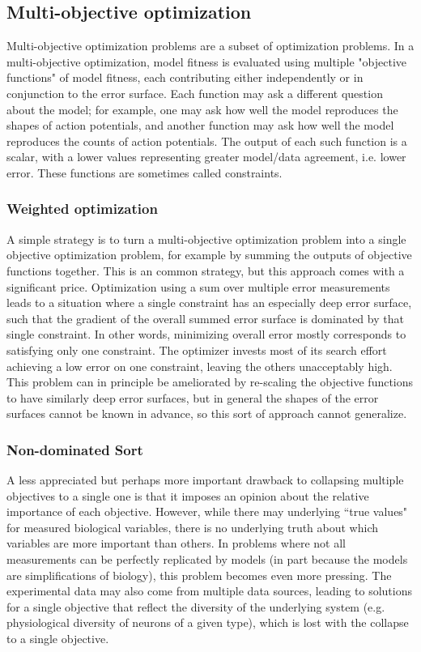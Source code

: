 \subsection{Multi-objective optimization} Multi-objective optimization problems are a subset of optimization problems.
In a multi-objective optimization, model fitness is evaluated using multiple "objective functions" of model fitness, each contributing either independently or in conjunction to the error surface.
Each function may ask a different question about the model; for example, one may ask how well the model reproduces the shapes of action potentials, and another function may ask how well the model reproduces the counts of action potentials.
The output of each such function is a scalar, with a lower values representing greater model/data agreement, i.e. lower error.
These functions are sometimes called constraints. 

\subsubsection{Weighted optimization} A simple strategy is to turn a multi-objective optimization problem into a single objective optimization problem, for example by summing the outputs of objective functions together. 
This is an common strategy, but this approach comes with a significant price.
Optimization using a sum over multiple error measurements leads to a situation where a single constraint has an especially deep error surface, such that the gradient of the overall summed error surface is dominated by that single constraint.
In other words, minimizing overall error mostly corresponds to satisfying only one constraint.
The optimizer invests most of its search effort achieving a low error on one constraint, leaving the others unacceptably high.
This problem can in principle be ameliorated by re-scaling the objective functions to have similarly deep error surfaces, but in general the shapes of the error surfaces cannot be known in advance, so this sort of approach cannot generalize.

\subsubsection{Non-dominated Sort} A less appreciated but perhaps more important drawback to collapsing multiple objectives to a single one is that it imposes an opinion about the relative importance of each objective.
However, while there may underlying ``true values" for measured biological variables, there is no underlying truth about which variables are more important than others.
In problems where not all measurements can be perfectly replicated by models (in part because the models are simplifications of biology), this problem becomes even more pressing.
The experimental data may also come from multiple data sources, leading to solutions for a single objective that reflect the diversity of the underlying system (e.g. physiological diversity of neurons of a given type), which is lost with the collapse to a single objective.

